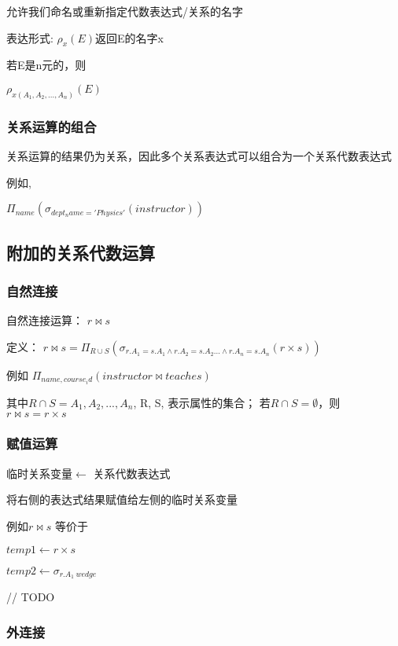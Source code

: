 \documentclass{article}        %
\begin{document}
允许我们命名或重新指定代数表达式/关系的名字 

表达形式: $\rho_x(E) $返回E的名字x 

若E是n元的，则 

$ \rho_{x(A_1,A_2,...,A_n)}(E) $ 

\subsubsection{关系运算的组合}

关系运算的结果仍为关系，因此多个关系表达式可以组合为一个关系代数表达式 

例如,

$\Pi_{name}(\sigma_{dept_name='Physics'}(instructor)) $

\subsection{附加的关系代数运算}

\subsubsection{自然连接}

自然连接运算： $ r \bowtie s $

定义：
$ r\bowtie s = \Pi_{R\cup S}(\sigma_{r.A_1=s.A_1\wedge r.A_2=s.A_2 ... \wedge r.A_n=s.A_n}(r\times s))$

例如 $ \Pi_{name,course_id}(instructor\bowtie teaches)$ 

其中$R\cap S = {A_1,A_2,...,A_n}$, R, S, 表示属性的集合；
若$R\cap S = \emptyset$，则 $r\bowtie s = r \times s$

\subsubsection{赋值运算}

临时关系变量$ \leftarrow $ 关系代数表达式 

将右侧的表达式结果赋值给左侧的临时关系变量 

例如$ r \bowtie s$ 等价于 

$ temp1 \leftarrow r \times s $ 

$ temp2 \leftarrow \sigma_{r.A_1 \ wedge} $ 

// TODO 

\subsubsection{外连接}
\end{document}
